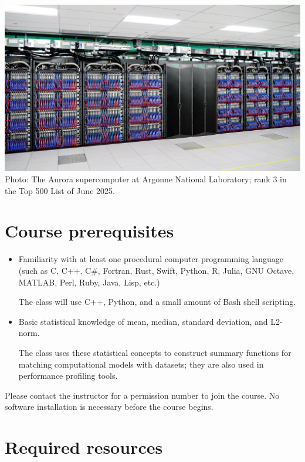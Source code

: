 \documentclass[12pt]{article}
\begin{document}
\noindent
\includegraphics[width=\linewidth]{1920x1080-Aurora hero image.jpg}
Photo: The Aurora supercomputer at Argonne National Laboratory; %
rank 3 in the Top 500 List of June 2025.

\section{Course prerequisites}

\begin{itemize}
\item Familiarity with at least one %
  procedural computer programming language %
  (such as C, C++, C\#, Fortran, Rust, Swift, %
  Python, R, Julia, GNU Octave, MATLAB, %
  Perl, Ruby, Java, Lisp, etc.)

  The class will use C++, Python, and a small amount of Bash shell scripting.
\item Basic statistical knowledge %
  of mean, median, standard deviation, and L2-norm.

  The class uses these statistical concepts to construct %
  summary functions for matching computational models with datasets; %
  they are also used in performance profiling tools.
\end{itemize}

\noindent
Please contact the instructor for a permission number to join the course.
%
No software installation is necessary before the course begins.

\section{Required resources}
\end{document}
